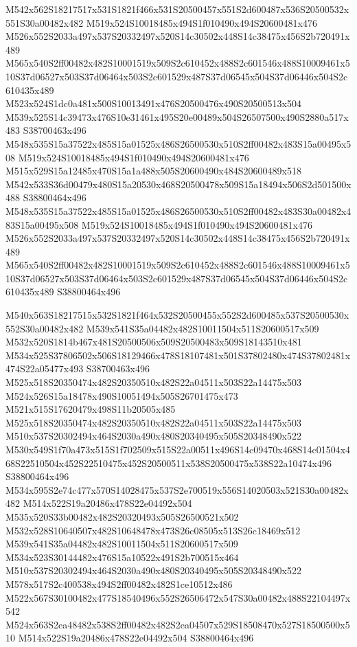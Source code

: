 \documentclass{article}
\begin{document}
\begin{multicols}{2}
M542x562S18217517x531S1821f466x531S20500457x551S2d600487x536S20500532x551S30a00482x482 M519x524S10018485x494S1f010490x494S20600481x476 M526x552S2033a497x537S20332497x520S14c30502x448S14c38475x456S2b720491x489 M565x540S2ff00482x482S10001519x509S2c610452x488S2c601546x488S10009461x510S37d06527x503S37d06464x503S2c601529x487S37d06545x504S37d06446x504S2c610435x489 M523x524S1dc0a481x500S10013491x476S20500476x490S20500513x504 M539x525S14c39473x476S10e31461x495S20e00489x504S26507500x490S2880a517x483 S38700463x496 M548x535S15a37522x485S15a01525x486S26500530x510S2ff00482x483S15a00495x508 M519x524S10018485x494S1f010490x494S20600481x476 M515x529S15a12485x470S15a1a488x505S20600490x484S20600489x518 M542x533S36d00479x480S15a20530x468S20500478x509S15a18494x506S2d501500x488 S38800464x496 M548x535S15a37522x485S15a01525x486S26500530x510S2ff00482x483S30a00482x483S15a00495x508 M519x524S10018485x494S1f010490x494S20600481x476 M526x552S2033a497x537S20332497x520S14c30502x448S14c38475x456S2b720491x489 M565x540S2ff00482x482S10001519x509S2c610452x488S2c601546x488S10009461x510S37d06527x503S37d06464x503S2c601529x487S37d06545x504S37d06446x504S2c610435x489 S38800464x496

M540x563S18217515x532S1821f464x532S20500455x552S2d600485x537S20500530x552S30a00482x482 M539x541S35a04482x482S10011504x511S20600517x509 M532x520S1814b467x481S20500506x509S20500483x509S18143510x481 M534x525S37806502x506S18129466x478S18107481x501S37802480x474S37802481x474S22a05477x493 S38700463x496 M525x518S20350474x482S20350510x482S22a04511x503S22a14475x503 M524x526S15a18478x490S10051494x505S26701475x473 M521x515S17620479x498S11b20505x485 M525x518S20350474x482S20350510x482S22a04511x503S22a14475x503 M510x537S20302494x464S2030a490x480S20340495x505S20348490x522 M530x549S1f70a473x515S1f702509x515S22a00511x496S14c09470x468S14c01504x468S22510504x452S22510475x452S20500511x538S20500475x538S22a10474x496 S38800464x496 M534x595S2e74c477x570S14028475x537S2e700519x556S14020503x521S30a00482x482 M514x522S19a20486x478S22e04492x504 M535x520S33b00482x482S20320493x505S26500521x502 M532x528S10640507x482S10648478x473S26c08505x513S26c18469x512 M539x541S35a04482x482S10011504x511S20600517x509 M534x523S30144482x476S15a10522x491S2b700515x464 M510x537S20302494x464S2030a490x480S20340495x505S20348490x522 M578x517S2c400538x494S2ff00482x482S1ce10512x486 M522x567S30100482x477S18540496x552S26506472x547S30a00482x488S22104497x542 M524x563S2ea48482x538S2ff00482x482S2ea04507x529S18508470x527S18500500x510 M514x522S19a20486x478S22e04492x504 S38800464x496


\end{multicols}
\end{document}

